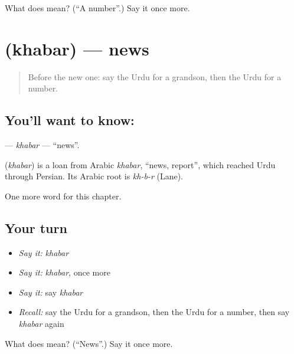 \begin{tcolorbox}[breakable,colback=teal!4,colframe=teal!35!black,title={Before you move on}]
What does  mean? (\textquotedblleft{}A number\textquotedblright{}.) Say it once more.
\end{tcolorbox}
\section[\texorpdfstring{\ur{خبر} (khabar)}{خبر (khabar)}]{ (khabar) — news}

\label{lesson:UR-C204-khabar}



\begin{quote}
Before the new one: say the Urdu for a grandson, then the Urdu for a number.
\end{quote}

\subsection*{You'll want to know: }
\textbf{} — \emph{khabar} — \textquotedblleft{}news\textquotedblright{}.

\begin{cousinweb}
\textbf{} (\emph{khabar}) is a loan from Arabic \emph{khabar}, \textquotedblleft{}news, report\textquotedblright{}, which reached Urdu through Persian. Its Arabic root is \emph{kh-b-r} (Lane).
\end{cousinweb}

\begin{grammarlens}[title={What you've built}]
One more word for this chapter.
\end{grammarlens}

\subsection*{Your turn}
\begin{itemize}
\raggedright
  \item \emph{Say it:} \emph{khabar}
  \item \emph{Say it:} \emph{khabar}, once more
  \item \emph{Say it:} say \emph{khabar}
  \item \emph{Recall:} say the Urdu for a grandson, then the Urdu for a number, then say \emph{khabar} again
\end{itemize}

\begin{tcolorbox}[breakable,colback=teal!4,colframe=teal!35!black,title={Before you move on}]
What does  mean? (\textquotedblleft{}News\textquotedblright{}.) Say it once more.
\end{tcolorbox}
